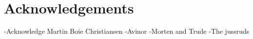\chapter*{Acknowledgements}
-Acknowledge Martin Boie Christiansen
-Avinor
-Morten and Trude
-The jussruds
